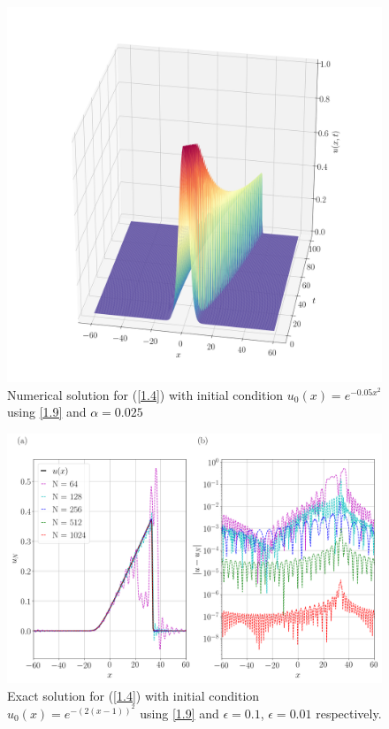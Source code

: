 	\begin{figure}
		\includegraphics[width=\textwidth]{Figures/Collocation/Graphics/eps=0.025/Numerical_Solution_alpha=0025.png}
		\caption{Numerical solution for (\ref{1.4}) with initial condition $u_0 (x) = e^{- 0.05 x^2}$ using \ref{1.9} and $\alpha = 0.025$}
		\label{Exact_Solution}
	\end{figure}
	\begin{figure}
		\includegraphics[width=\textwidth]{Figures/Collocation/Graphics/eps=0.025/Numerical_Solution_alpha=0025_T=100.png}
		\caption{Exact solution for (\ref{1.4}) with initial condition $u_0 (x) = e^{-(2(x - 1))^2}$ using \ref{1.9} and $\epsilon = 0.1$, $\epsilon = 0.01$ respectively.}
		\label{Exact_Solution}
	\end{figure}
